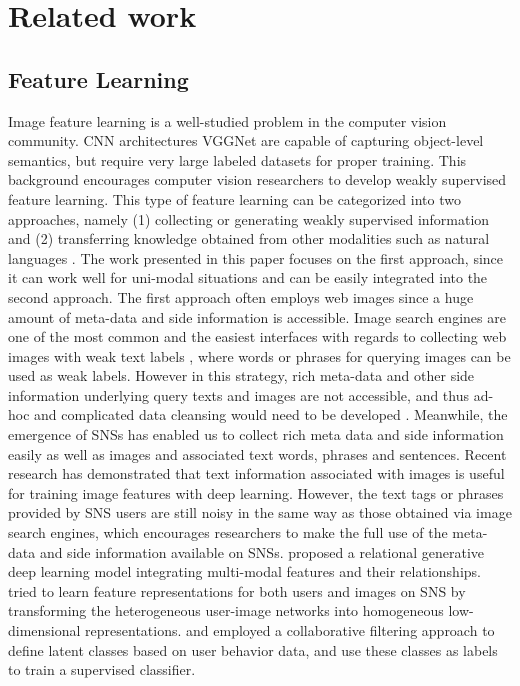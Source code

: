 \documentclass[letterpaper]{article} %
\begin{document}
\section{Related work}
\label{sec:related}

\subsection{Feature Learning}
\label{sec:related:learning}
\indent

Image feature learning is a well-studied problem in the computer vision community.
CNN architectures VGGNet \cite{Simonyan2014} are capable of capturing object-level semantics, but require very large labeled datasets for proper training.
This background encourages computer vision researchers to develop weakly supervised feature learning.
This type of feature learning can be categorized into two approaches, namely (1) collecting or generating weakly supervised information and (2) transferring knowledge obtained from other modalities such as natural languages \cite{Socher2013,Silberer2014,Hoffman2016,Changpinyo2016}.
The work presented in this paper focuses on the first approach, since it can work well for uni-modal situations and can be easily integrated into the second approach.
The first approach often employs web images since a huge amount of meta-data and side information is accessible.
Image search engines are one of the most common and the easiest interfaces with regards to collecting web images with weak text labels \cite{Sukhbaatar2015}, where words or phrases for querying images can be used as weak labels.
However in this strategy, rich meta-data and other side information underlying query texts and images are not accessible, and thus ad-hoc and complicated data cleansing would need to be developed \cite{Yashima2016}.
Meanwhile, the emergence of SNSs has enabled us to collect rich meta data and side information easily as well as images and associated text words, phrases and sentences.
Recent research \cite{Joulin2016} has demonstrated that text information associated with images is useful for training image features with deep learning.
However, the text tags or phrases provided by SNS users are still noisy in the same way as those obtained via image search engines, which encourages researchers to make the full use of the meta-data and side information available on SNSs.
\cite{Yuan2013} proposed a relational generative deep learning model integrating multi-modal features and their relationships.
\cite{Geng2015} tried to learn feature representations for both users and images on SNS by transforming the heterogeneous user-image networks into homogeneous low-dimensional representations.
\cite{Fang2015} and \cite{Zhang2016} employed a collaborative filtering approach to define latent classes based on user behavior data, and use these classes as labels to train a supervised classifier.
\end{document}
